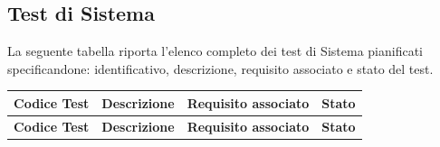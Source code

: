 \subsection{Test di Sistema}
La seguente tabella riporta l’elenco completo dei test di Sistema pianificati specificandone: identificativo, descrizione, requisito associato e stato del test.
\renewcommand{\arraystretch}{1.2}
\begin{longtable}{|
    >{\raggedright\arraybackslash}p{} |
    >{\raggedright\arraybackslash}p{} |
    >{\raggedright\arraybackslash}p{} |
    >{\centering\arraybackslash}p{} |
    }
    \hline
    \rowcolor[gray]{0.9}
    \textbf{Codice Test} & \textbf{Descrizione} & \textbf{Requisito associato} & \textbf{Stato} \\
    \hline
    \endfirsthead

    \hline
    \rowcolor[gray]{0.9}
    \textbf{Codice Test} & \textbf{Descrizione} & \textbf{Requisito associato} & \textbf{Stato} \\
    \hline
    \endhead


\end{longtable}
